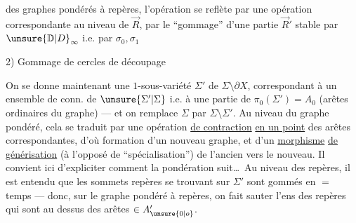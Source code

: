 
des graphes pondérés à repères, l'opération  se reflète par une opération correspondante au niveau de $\vec R$, par le ``gommage'' d'une partie $\vec R'$ stable par ${\unsure{\mathbb D|D}}_\infty$ i.e. par $\sigma_0,\sigma_1$

2) Gommage de cercles de découpage

On se donne maintenant une  $1$-sous-variété  $\Sigma'$ de $\Sigma\setminus\partial X$, correspondant à un ensemble  de  conn. de $\unsure{\Sigma'|\Sigma}$ i.e. à une partie  de $\pi_0(\Sigma')=A_0$ (arêtes ordinaires du graphe) --- et on remplace $\Sigma$ par $\Sigma\setminus\Sigma'$. Au niveau du graphe pondéré, cela se traduit par une opération \uline{de contraction} \uline{en un point} des arêtes correspondantes, d'où formation d'un nouveau graphe, et d'un \uline{morphisme} \uline{de générisation} (à l'opposé de ``spécialisation'') de l'ancien vers le nouveau. Il convient ici d'expliciter comment la pondération suit\ldots\ Au niveau des repères, il est entendu que les sommets repères se trouvant sur $\Sigma'$ sont gommés en $=$ temps --- donc, sur le graphe pondéré à repères, on fait sauter l'ens des repères qui sont au dessus des arêtes $\in A_{\unsure{0|o}}'$.

